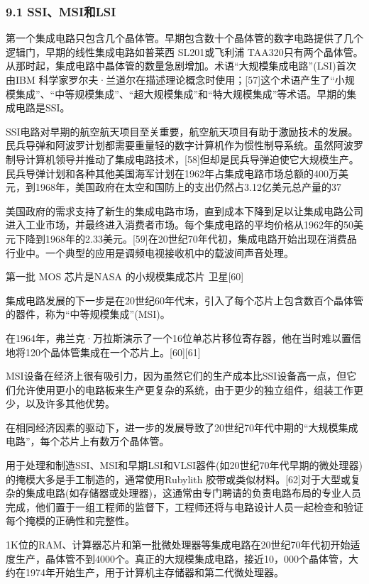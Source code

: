 \subsubsection{9.1 SSI、MSI和LSI}

第一个集成电路只包含几个晶体管。早期包含数十个晶体管的数字电路提供了几个逻辑门，早期的线性集成电路如普莱西 SL201或飞利浦 TAA320只有两个晶体管。从那时起，集成电路中晶体管的数量急剧增加。术语“大规模集成电路”(LSI)首次由IBM 科学家罗尔夫·兰道尔在描述理论概念时使用；[57]这个术语产生了“小规模集成”、“中等规模集成”、“超大规模集成”和“特大规模集成”等术语。早期的集成电路是SSI。

SSI电路对早期的航空航天项目至关重要，航空航天项目有助于激励技术的发展。民兵导弹和阿波罗计划都需要重量轻的数字计算机作为惯性制导系统。虽然阿波罗制导计算机领导并推动了集成电路技术，[58]但却是民兵导弹迫使它大规模生产。民兵导弹计划和各种其他美国海军计划在1962年占集成电路市场总额的400万美元，到1968年，美国政府在太空和国防上的支出仍然占3.12亿美元总产量的37%

美国政府的需求支持了新生的集成电路市场，直到成本下降到足以让集成电路公司进入工业市场，并最终进入消费者市场。每个集成电路的平均价格从1962年的50美元下降到1968年的2.33美元。[59]在20世纪70年代初，集成电路开始出现在消费品行业中。一个典型的应用是调频电视接收机中的载波间声音处理。

第一批 MOS 芯片是NASA 的小规模集成芯片 卫星[60]

集成电路发展的下一步是在20世纪60年代末，引入了每个芯片上包含数百个晶体管的器件，称为“中等规模集成”(MSI)。

在1964年，弗兰克·万拉斯演示了一个16位单芯片移位寄存器，他在当时难以置信地将120个晶体管集成在一个芯片上。[60][61]

MSI设备在经济上很有吸引力，因为虽然它们的生产成本比SSI设备高一点，但它们允许使用更小的电路板来生产更复杂的系统，由于更少的独立组件，组装工作更少，以及许多其他优势。

在相同经济因素的驱动下，进一步的发展导致了20世纪70年代中期的“大规模集成电路”，每个芯片上有数万个晶体管。

用于处理和制造SSI、MSI和早期LSI和VLSI器件(如20世纪70年代早期的微处理器)的掩模大多是手工制造的，通常使用Rubylith 胶带或类似材料。[62]对于大型或复杂的集成电路(如存储器或处理器)，这通常由专门聘请的负责电路布局的专业人员完成，他们置于一组工程师的监督下，工程师还将与电路设计人员一起检查和验证每个掩模的正确性和完整性。

1K位的RAM、计算器芯片和第一批微处理器等集成电路在20世纪70年代初开始适度生产，晶体管不到4000个。真正的大规模集成电路，接近10，000个晶体管，大约在1974年开始生产，用于计算机主存储器和第二代微处理器。

